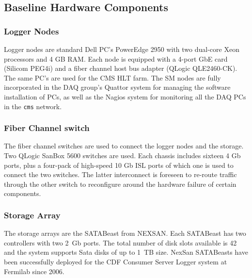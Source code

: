 \subsection{Baseline Hardware Components}

\subsubsection{Logger Nodes}
Logger nodes are standard Dell PC's PowerEdge 2950 with two dual-core Xeon processors and 4 GB RAM. 
Each node is equipped with a 4-port GbE card (Silicom PEG4i) and 
a fiber channel host bus adapter (QLogic QLE2460-CK). 
The same PC's are used for the CMS HLT farm.
The SM nodes are fully incorporated in the DAQ group's Quattor system for managing 
the software installation of PCs, as well as the Nagios system
for monitoring all the DAQ PCs in the \verb+cms+ network.

\subsubsection{Fiber Channel switch}

The fiber channel switches are used to connect the logger nodes and the storage. 
Two QLogic SanBox 5600 switches are used. 
Each chassis includes sixteen 4 Gb ports, plus a four-pack of high-speed 10 Gb ISL ports 
of which one is used to connect the two switches.
The latter interconnect is foreseen to re-route traffic through the other switch
to reconfigure around the hardware failure of certain components.

\subsubsection{Storage Array}

The storage arrays are the SATABeast from NEXSAN. 
Each SATABeast has two controllers with two 2~Gb ports.
The total number of disk slots available is 42 and the system supports Sata disks 
of up to 1~TB size. 
NexSan SATABeasts have been successfully deployed for the CDF Consumer Server Logger system 
at Fermilab since 2006.

